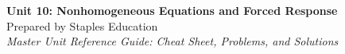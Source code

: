 




\begin{center}
    {\LARGE \bfseries Unit 10: Nonhomogeneous Equations and Forced Response}\\[6pt]
    {\large Prepared by Staples Education}\\[4pt]
    {\itshape Master Unit Reference Guide: Cheat Sheet, Problems, and Solutions}
\end{center}

\vspace{0.4em}

\tableofcontents

\vspace{0.4em}

